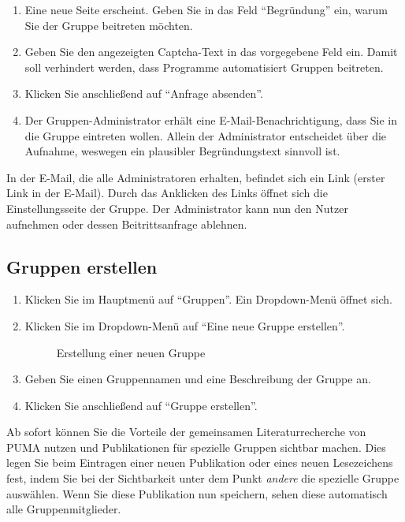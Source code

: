 \begin{enumerate}
    \item Eine neue Seite erscheint. Geben Sie in das Feld \enquote{Begründung} ein, warum Sie der Gruppe beitreten möchten.
    \item Geben Sie den angezeigten Captcha-Text in das vorgegebene Feld ein. Damit soll verhindert werden, dass Programme automatisiert Gruppen beitreten. 
    \item Klicken Sie anschließend auf \enquote{Anfrage absenden}.
    \item Der Gruppen-Administrator erhält eine E-Mail-Benachrichtigung, dass Sie in die Gruppe eintreten wollen. Allein der Administrator entscheidet über die Aufnahme, weswegen ein plausibler Begründungstext sinnvoll ist.
\end{enumerate}
In der E-Mail, die alle Administratoren erhalten, befindet sich ein Link (erster Link in der E-Mail). Durch das Anklicken des Links öffnet sich die Einstellungsseite der Gruppe. Der Administrator kann nun den Nutzer aufnehmen oder dessen Beitrittsanfrage ablehnen.
\subsection{Gruppen erstellen}
\label{subsec:gruppenErstellen}
\begin{enumerate}
    \item Klicken Sie im Hauptmenü auf \enquote{Gruppen}. Ein Dropdown-Menü öffnet sich.
    \item Klicken Sie im Dropdown-Menü auf \enquote{Eine neue Gruppe erstellen}.
\begin{figure}[h!]
 \centering
 \caption{Erstellung einer neuen Gruppe}
 \label{fig:erstellungNeueGruppe}
\end{figure}
    \item Geben Sie einen Gruppennamen und eine Beschreibung der Gruppe an. 
    \item Klicken Sie anschließend auf \enquote{Gruppe erstellen}. 
\end{enumerate}
Ab sofort können Sie die Vorteile der gemeinsamen Literaturrecherche von PUMA nutzen und Publikationen für spezielle Gruppen sichtbar machen. Dies legen Sie beim Eintragen einer neuen Publikation oder eines neuen Lesezeichens fest, indem Sie bei der Sichtbarkeit unter dem Punkt \textit{andere} die spezielle Gruppe auswählen. Wenn Sie diese Publikation nun speichern, sehen diese automatisch alle Gruppenmitglieder.
